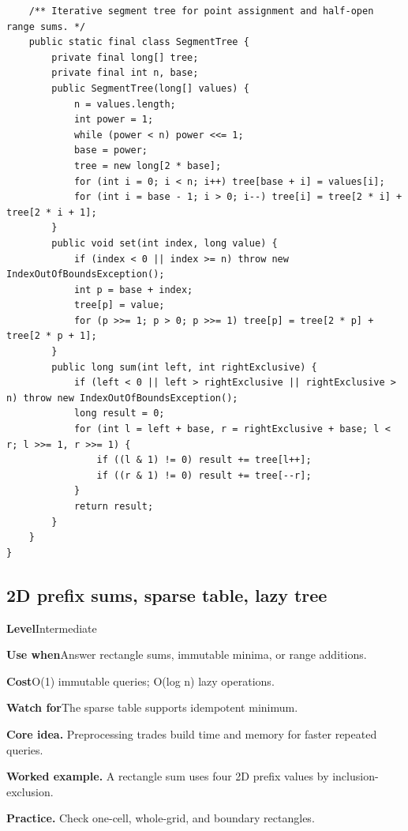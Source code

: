\documentclass[10pt,letterpaper]{article}
\newcommand{\entrylabel}[1]{\textcolor{accent}{\bfseries #1}}
\begin{document}
\begin{lstlisting}
    /** Iterative segment tree for point assignment and half-open range sums. */
    public static final class SegmentTree {
        private final long[] tree;
        private final int n, base;
        public SegmentTree(long[] values) {
            n = values.length;
            int power = 1;
            while (power < n) power <<= 1;
            base = power;
            tree = new long[2 * base];
            for (int i = 0; i < n; i++) tree[base + i] = values[i];
            for (int i = base - 1; i > 0; i--) tree[i] = tree[2 * i] + tree[2 * i + 1];
        }
        public void set(int index, long value) {
            if (index < 0 || index >= n) throw new IndexOutOfBoundsException();
            int p = base + index;
            tree[p] = value;
            for (p >>= 1; p > 0; p >>= 1) tree[p] = tree[2 * p] + tree[2 * p + 1];
        }
        public long sum(int left, int rightExclusive) {
            if (left < 0 || left > rightExclusive || rightExclusive > n) throw new IndexOutOfBoundsException();
            long result = 0;
            for (int l = left + base, r = rightExclusive + base; l < r; l >>= 1, r >>= 1) {
                if ((l & 1) != 0) result += tree[l++];
                if ((r & 1) != 0) result += tree[--r];
            }
            return result;
        }
    }
}
\end{lstlisting}
\subsection{2D prefix sums, sparse table, lazy tree}
\begin{guidebox}\small
\entrylabel{Level}\quad Intermediate\par
\entrylabel{Use when}\quad Answer rectangle sums, immutable minima, or range additions.\par
\entrylabel{Cost}\quad O(1) immutable queries; O(log n) lazy operations.\par
\entrylabel{Watch for}\quad The sparse table supports idempotent minimum.\par
\end{guidebox}
\noindent\textbf{Core idea.} Preprocessing trades build time and memory for faster repeated queries.\par
\noindent\textbf{Worked example.} A rectangle sum uses four 2D prefix values by inclusion-exclusion.\par
\noindent\textbf{Practice.} Check one-cell, whole-grid, and boundary rectangles.\par
\end{document}
